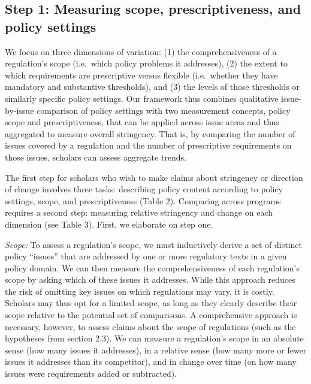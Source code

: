 \documentclass[
      12pt,
            Review ]{article}
\begin{document}
\subsection{Step 1: Measuring scope, prescriptiveness, and policy
settings}\label{step-1-measuring-scope-prescriptiveness-and-policy-settings}

We focus on three dimensions of variation: (1) the comprehensiveness of
a regulation's scope (i.e.~which policy problems it addresses), (2) the
extent to which requirements are prescriptive versus flexible
(i.e.~whether they have mandatory and substantive thresholds), and (3)
the levels of those thresholds or similarly specific policy settings.
Our framework thus combines qualitative issue-by-issue comparison of
policy settings with two measurement concepts, policy scope and
prescriptiveness, that can be applied across issue areas and thus
aggregated to measure overall stringency. That is, by comparing the
number of issues covered by a regulation and the number of prescriptive
requirements on those issues, scholars can assess aggregate trends.

The first step for scholars who wish to make claims about stringency or
direction of change involves three tasks: describing policy content
according to policy settings, scope, and prescriptiveness (Table 2).
Comparing across programs requires a second step: measuring relative
stringency and change on each dimension (see Table 3). First, we
elaborate on step one.



\emph{Scope:} To assess a regulation's scope, we must inductively derive
a set of distinct policy ``issues'' that are addressed by one or more
regulatory texts in a given policy domain. We can then measure the
comprehensiveness of each regulation's scope by asking which of these
issues it addresses. While this approach reduces the risk of omitting
key issues on which regulations may vary, it is costly. Scholars may
thus opt for a limited scope, as long as they clearly describe their
scope relative to the potential set of comparisons. A comprehensive
approach is necessary, however, to assess claims about the scope of
regulations (such as the hypotheses from section 2.3). We can measure a
regulation's scope in an absolute sense (how many issues it addresses),
in a relative sense (how many more or fewer issues it addresses than its
competitor), and in change over time (on how many issues were
requirements added or subtracted).
\end{document}
